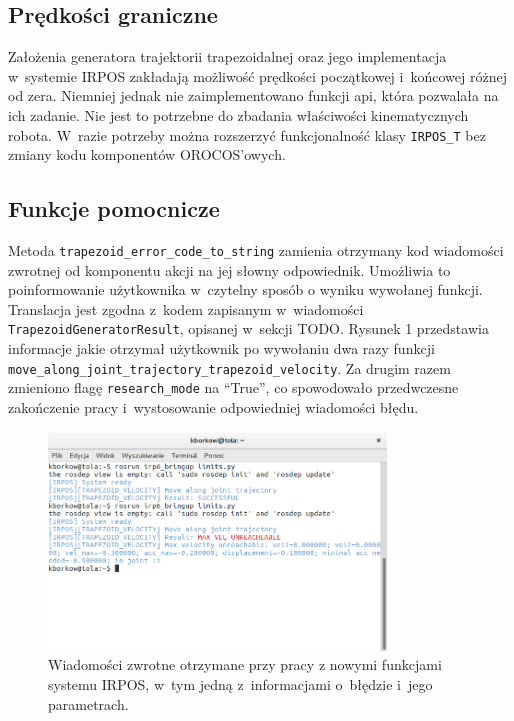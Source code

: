 \documentclass[a4paper, 12pt]{article}
\begin{document}
	\subsection{Prędkości graniczne}
	Założenia generatora trajektorii trapezoidalnej oraz jego implementacja w~systemie IRPOS zakładają możliwość prędkości początkowej i~końcowej różnej od zera. Niemniej jednak nie zaimplementowano funkcji api, która pozwalała na ich zadanie. Nie jest to potrzebne do zbadania właściwości kinematycznych robota. W~razie potrzeby można rozszerzyć funkcjonalność klasy \texttt{IRPOS\_T} bez zmiany kodu komponentów OROCOS'owych.
	
	\subsection{Funkcje pomocnicze}
	\label{sec:auxilary}
	Metoda \texttt{trapezoid\_error\_code\_to\_string} zamienia otrzymany kod wiadomości zwrotnej od komponentu akcji na jej słowny odpowiednik. Umożliwia to poinformowanie użytkownika w~czytelny sposób o wyniku wywołanej funkcji.
	Translacja jest zgodna z~kodem zapisanym w~wiadomości \texttt{TrapezoidGeneratorResult}, opisanej w~sekcji TODO. Rysunek 1 przedstawia informacje jakie otrzymał użytkownik po wywołaniu dwa razy funkcji 
	\linebreak
	\texttt{move\_along\_joint\_trajectory\_trapezoid\_velocity}. Za drugim razem zmieniono flagę \linebreak \texttt{research\_mode} na \textquotedblleft True\textquotedblright, co spowodowało przedwczesne zakończenie pracy i~wystosowanie odpowiedniej wiadomości błędu.
	\begin{figure}[t]
	\centering
	\includegraphics[width=0.8\textwidth]{raport_pics/msgs_from_gen.png}
	\caption{Wiadomości zwrotne otrzymane przy pracy z nowymi funkcjami systemu IRPOS, w~tym jedną z~informacjami o~błędzie i~jego parametrach.}
	\label{}
	\end{figure}
	
\end{document}
